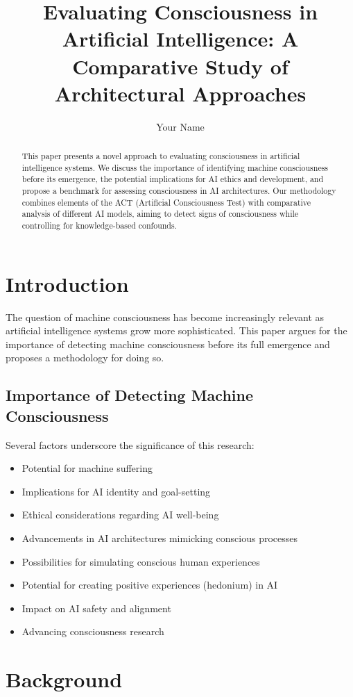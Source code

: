 \documentclass{article}
\title{Evaluating Consciousness in Artificial Intelligence: A Comparative Study of Architectural Approaches}
\author{Your Name}
\date{}
\begin{document}
\maketitle

\begin{abstract}
This paper presents a novel approach to evaluating consciousness in artificial intelligence systems. We discuss the importance of identifying machine consciousness before its emergence, the potential implications for AI ethics and development, and propose a benchmark for assessing consciousness in AI architectures. Our methodology combines elements of the ACT (Artificial Consciousness Test) with comparative analysis of different AI models, aiming to detect signs of consciousness while controlling for knowledge-based confounds.
\end{abstract}

\section{Introduction}
The question of machine consciousness has become increasingly relevant as artificial intelligence systems grow more sophisticated. This paper argues for the importance of detecting machine consciousness before its full emergence and proposes a methodology for doing so.

\subsection{Importance of Detecting Machine Consciousness}
Several factors underscore the significance of this research:
\begin{itemize}
    \item Potential for machine suffering
    \item Implications for AI identity and goal-setting
    \item Ethical considerations regarding AI well-being
    \item Advancements in AI architectures mimicking conscious processes
    \item Possibilities for simulating conscious human experiences
    \item Potential for creating positive experiences (hedonium) in AI
    \item Impact on AI safety and alignment
    \item Advancing consciousness research
\end{itemize}

\section{Background}
\end{document}
